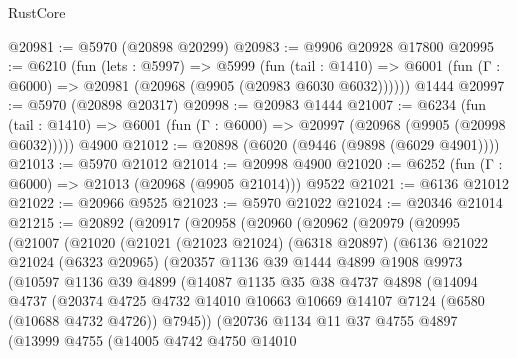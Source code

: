 \begin{lexlean}{RustCore}
\begin{coremodule}
@20981 := @5970 (@20898 @20299)
@20983 := @9906 @20928 @17800
@20995 := @6210
    (fun (lets : @5997) =>
    @5999
      (fun (tail : @1410) =>
      @6001 (fun (Γ : @6000) => @20981 (@20968 (@9905 (@20983 @6030 @6032))))))
    @1444
@20997 := @5970 (@20898 @20317)
@20998 := @20983 @1444
@21007 := @6234
    (fun (tail : @1410) => @6001 (fun (Γ : @6000) => @20997 (@20968 (@9905 (@20998 @6032)))))
    @4900
@21012 := @20898 (@6020 (@9446 (@9898 (@6029 @4901))))
@21013 := @5970 @21012
@21014 := @20998 @4900
@21020 := @6252 (fun (Γ : @6000) => @21013 (@20968 (@9905 @21014))) @9522
@21021 := @6136 @21012
@21022 := @20966 @9525
@21023 := @5970 @21022
@21024 := @20346 @21014
@21215 := @20892
    (@20917
      (@20958
        (@20960
          (@20962
            (@20979
              (@20995
                (@21007
                  (@21020
                    (@21021
                      (@21023 @21024)
                      (@6318 @20897)
                      (@6136
                        @21022
                        @21024
                        (@6323 @20965)
                        (@20357
                          @1136
                          @39
                          @1444
                          @4899
                          @1908
                          @9973
                          (@10597
                            @1136
                            @39
                            @4899
                            (@14087
                              @1135
                              @35
                              @38
                              @4737
                              @4898
                              (@14094
                                @4737
                                (@20374
                                  @4725
                                  @4732
                                  @14010
                                  @10663
                                  @10669
                                  @14107
                                  @7124
                                  (@6580 (@10688 @4732 @4726))
                                  @7945))
                              (@20736
                                @1134
                                @11
                                @37
                                @4755
                                @4897
                                (@13999
                                  @4755
                                  (@14005
                                    @4742
                                    @4750
                                    @14010

\end{coremodule}
\end{lexlean}
